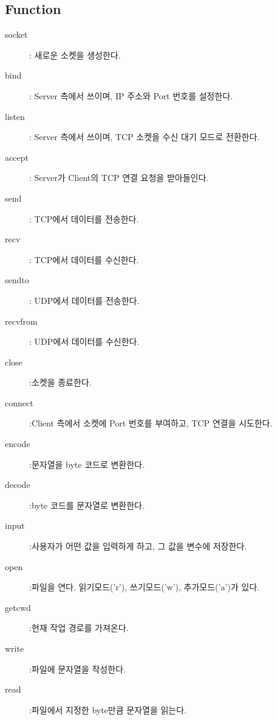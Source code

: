 \begin{multicols}{2}
\subsection{Function}
\begin{description}
    \item[socket] : 새로운 소켓을 생성한다. \vspace{-1mm}
    \item[bind] : Server 측에서 쓰이며, IP 주소와 Port 번호를 설정한다. \vspace{-1mm}
    \item[listen] : Server 측에서 쓰이며, TCP 소켓을 수신 대기 모드로 전환한다. \vspace{-1mm}
    \item[accept] : Server가 Client의 TCP 연결 요청을 받아들인다. \vspace{-1mm}
    \item[send] : TCP에서 데이터를 전송한다. \vspace{-1mm}
    \item[recv] : TCP에서 데이터를 수신한다. \vspace{-1mm}
    \item[sendto] : UDP에서 데이터를 전송한다. \vspace{-1mm}
    \item[recvfrom] : UDP에서 데이터를 수신한다. \vspace{-1mm}
    \item[close] :소켓을 종료한다. \vspace{-1mm}
    \item[connect] :Client 측에서 소켓에 Port 번호를 부여하고, TCP 연결을 시도한다. \vspace{-1mm}
    \item[encode] :문자열을 byte 코드로 변환한다. \vspace{-1mm}
    \item[decode] :byte 코드를 문자열로 변환한다. \vspace{-1mm}
    \item[input] :사용자가 어떤 값을 입력하게 하고, 그 값을 변수에 저장한다. \vspace{-1mm}
    \item[open] :파일을 연다. 읽기모드(’r’), 쓰기모드(’w’), 추가모드(’a’)가 있다. \vspace{-1mm}
    \item[getcwd] :현재 작업 경로를 가져온다. \vspace{-1mm}
    \item[write] :파일에 문자열을 작성한다. \vspace{-1mm}
    \item[read] :파일에서 지정한 byte만큼 문자열을 읽는다. \vspace{-1mm}
\end{description}
\end{multicols}